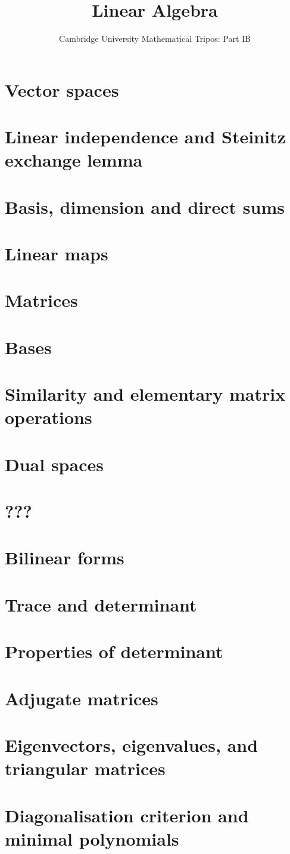 \documentclass{article}
\title{Linear Algebra}
\author{Cambridge University Mathematical Tripos: Part IB}
\begin{document}
\maketitle

\tableofcontentsnewpage{}

\section{Vector spaces}

\section{Linear independence and Steinitz exchange lemma}

\section{Basis, dimension and direct sums}

\section{Linear maps}

\section{Matrices}

\section{Bases}

\section{Similarity and elementary matrix operations}

\section{Dual spaces}

\section{???}

\section{Bilinear forms}

\section{Trace and determinant}

\section{Properties of determinant}

\section{Adjugate matrices}

\section{Eigenvectors, eigenvalues, and triangular matrices}

\section{Diagonalisation criterion and minimal polynomials}

\end{document}
